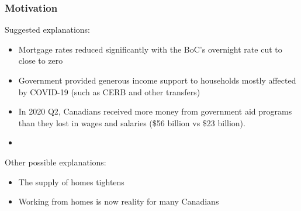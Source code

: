 \documentclass[blue]{beamer}
\begin{document}
\begin{frame} \frametitle{Motivation}
\label{motivation}
 Suggested explanations: 
            \begin{itemize}    
                  \item Mortgage rates reduced significantly with the BoC's overnight rate cut to close to zero \\
                  \hfill \hyperlink{house_sales}{}  \hfill \hyperlink{mortgage}{} \hfill \hyperlink{deferral}{}
                  \item Government provided generous income support to households mostly affected by COVID-19 (such as CERB and other transfers)
                  \item In 2020 Q2, Canadians received more money from government aid programs than they lost in wages and salaries (\$56 billion vs \$23 billion). 
                  \item []
 \end{itemize}
 Other possible explanations: %
  \begin{itemize}    
  \item The supply of homes tightens   \hfill \hyperlink{home_supply}{}
  \item Working from homes is now reality for many Canadians
       \hfill \hyperlink{moving_out}{}  
  
   \end{itemize}
\end{frame}
\end{document}
